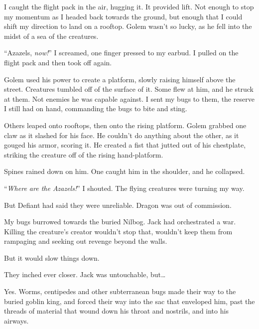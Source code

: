 I caught the flight pack in the air, hugging it.  It provided lift.  Not enough to stop my momentum as I headed back towards the ground, but enough that I could shift my direction to land on a rooftop.  Golem wasn't so lucky, as he fell into the midst of a sea of the creatures.



``Azazels, \emph{now!}'' I screamed, one finger pressed to my earbud.  I pulled on the flight pack and then took off again.



Golem used his power to create a platform, slowly raising himself above the street.  Creatures tumbled off of the surface of it.  Some flew at him, and he struck at them.  Not enemies he was capable against.  I sent my bugs to them, the reserve I still had on hand, commanding the bugs to bite and sting.



Others leaped onto rooftops, then onto the rising platform.  Golem grabbed one claw as it slashed for his face.  He couldn't do anything about the other, as it gouged his armor, scoring it.  He created a fist that jutted out of his chestplate, striking the creature off of the rising hand-platform.



Spines rained down on him.  One caught him in the shoulder, and he collapsed.



``\emph{Where are the Azazels!}'' I shouted.  The flying creatures were turning my way.



But Defiant had said they were unreliable.  Dragon was out of commission.



My bugs burrowed towards the buried Nilbog.  Jack had orchestrated a war.  Killing the creature's creator wouldn't stop that, wouldn't keep them from rampaging and seeking out revenge beyond the walls.



But it would slow things down.



They inched ever closer.  Jack was untouchable, but\ldots



Yes.  Worms, centipedes and other subterranean bugs made their way to the buried goblin king, and forced their way into the sac that enveloped him, past the threads of material that wound down his throat and nostrils, and into his airways.



